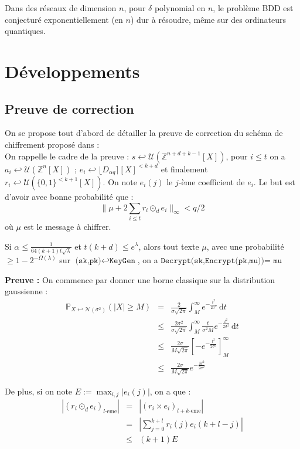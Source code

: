 \documentclass[11pt,a4paper]{article}
\begin{document}
\begin{conj}
Dans des réseaux de dimension $n$, pour $\delta$ polynomial en $n$, le problème BDD est conjecturé exponentiellement (en $n$) dur à résoudre, même sur des ordinateurs quantiques.
\end{conj}


\section{Développements}
\subsection{Preuve de correction}
On se propose tout d'abord de détailler la preuve de correction du schéma de chiffrement proposé dans \cite{mplwe} : \\

On rappelle le cadre de la preuve : $s \hookleftarrow \mathcal{U}(\mathbb{Z}^{n+d+k-1}[X])$, pour $i\leq t$ on a $a_i \hookleftarrow \mathcal{U}(\mathbb{Z}^n[X])$ ; $e_i \hookleftarrow \lfloor D_{\alpha q}\rceil[X]^{<k+d}$ et finalement $r_i \hookleftarrow \mathcal{U}(\{0,1\}^{<k+1}[X])$. On note $e_i(j)$ le $j$-ème coefficient de $e_i$. Le but est d'avoir avec bonne probabilité que : 
\[\|\mu + 2\sum_{i \leq t}r_i \odot_d e_i  \|_\infty < q/2 \] où $\mu$ est le message à chiffrer. 
\begin{theorem}
Si $\alpha \leq \frac{1}{64(k+1)t\sqrt{\lambda}}$ et $t(k+d)\leq e^\lambda$, alors tout texte $\mu$, avec une probabilité $\geq 1 - 2^{-\Omega(\lambda)}$ sur $\texttt{(sk,pk)}\hookleftarrow\texttt{KeyGen} $, on a $\texttt{Decrypt(sk,Encrypt(pk,mu))= mu}$ 
\end{theorem}
\textbf{Preuve :}
On commence par donner une borne classique sur la distribution gaussienne : 
\begin{eqnarray*}
\mathbb{P}_{X \hookleftarrow \mathcal{N}(\sigma^2)}(|X| \geq M) &=& \frac{2}{\sigma \sqrt{2 \pi}} \int_{M}^\infty e^{-\frac{t^2}{2 \sigma^2}} \, \mathrm{d}t \\
&\leq &  \frac{2\sigma^2}{\sigma \sqrt{2 \pi}}\int_{M}^\infty \frac{t}{\sigma^2 M} e^{-\frac{t^2}{2 \sigma^2}} \, \mathrm{d}t \\
& \leq & \frac{2\sigma}{M \sqrt{2 \pi}} [-e^{-\frac{t^2}{2 \sigma^2}}]_M^\infty \\
& \leq & \frac{2\sigma}{M \sqrt{2 \pi}} e^{-\frac{M^2}{2 \sigma^2}}
\end{eqnarray*}


De plus, si on note $E := \max_{i,j} |e_i(j)|$, on a que :  \\
\begin{eqnarray*}
|(r_i \odot_d e_i)_{l\text{-eme}}| &=& |(r_i\times e_i)_{l+k\text{-eme}}| \\
&=& |\sum_{j=0}^{k+l}r_i(j)e_i(k+l-j)| \\
&\leq& (k+1)E
\end{eqnarray*}
\end{document}
